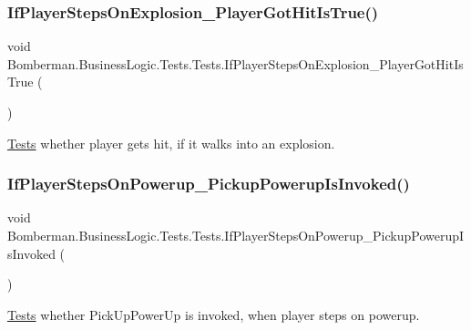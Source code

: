 \subsubsection{\texorpdfstring{IfPlayerStepsOnExplosion\_PlayerGotHitIsTrue()}{IfPlayerStepsOnExplosion\_PlayerGotHitIsTrue()}}
{\footnotesize\ttfamily void Bomberman.\+Business\+Logic.\+Tests.\+Tests.\+If\+Player\+Steps\+On\+Explosion\+\_\+\+Player\+Got\+Hit\+Is\+True (\begin{DoxyParamCaption}{ }\end{DoxyParamCaption})\hspace{0.3cm}{\ttfamily [inline]}}



\mbox{\hyperlink{class_bomberman_1_1_business_logic_1_1_tests_1_1_tests}{Tests}} whether player gets hit, if it walks into an explosion. 

\mbox{\label{class_bomberman_1_1_business_logic_1_1_tests_1_1_tests_a59522090b27a18e3c30ff129bb651b56}} 
\subsubsection{\texorpdfstring{IfPlayerStepsOnPowerup\_PickupPowerupIsInvoked()}{IfPlayerStepsOnPowerup\_PickupPowerupIsInvoked()}}
{\footnotesize\ttfamily void Bomberman.\+Business\+Logic.\+Tests.\+Tests.\+If\+Player\+Steps\+On\+Powerup\+\_\+\+Pickup\+Powerup\+Is\+Invoked (\begin{DoxyParamCaption}{ }\end{DoxyParamCaption})\hspace{0.3cm}{\ttfamily [inline]}}



\mbox{\hyperlink{class_bomberman_1_1_business_logic_1_1_tests_1_1_tests}{Tests}} whether Pick\+Up\+Power\+Up is invoked, when player steps on powerup. 

\mbox{\label{class_bomberman_1_1_business_logic_1_1_tests_1_1_tests_a5f31456cb6dc981fa460b4a172974caf}} 
